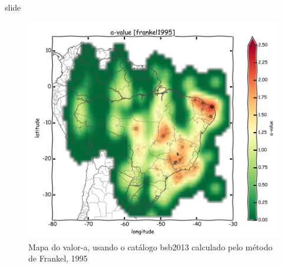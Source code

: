 \documentclass[ucs,8pt]{beamer}
\begin{document}
\begin{frame}{slide}

\begin{figure}[H]
  \centering
  \includegraphics[height=.80\textheight]{a_frankel_br} 
  \caption{Mapa do valor-a, usando o catálogo \gls{bsb2013} calculado pelo método de Frankel, 1995 }
  \label{fig:a_fran_br} 
\end{figure}

\end{frame}
\end{document}
